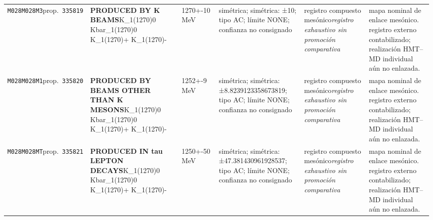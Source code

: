 \begin{landscape}
\begin{longtable}{L{1.85cm}L{4.45cm}L{2.35cm}L{4.05cm}L{3.35cm}L{7.15cm}}
\texttt{M028}\newline \texttt{M028M3}\newline prop.\ \texttt{335819} & \textbf{PRODUCED BY K BEAMS}\newline K\_\allowbreak{}1(1270)0 \textbar{}\allowbreak{} Kbar\_\allowbreak{}1(1270)0 \textbar{}\allowbreak{} K\_\allowbreak{}1(1270)+ \textbar{}\allowbreak{} K\_\allowbreak{}1(1270)- & 1270+-10\,MeV & simétrica; simétrica: ±10; tipo AC; límite NONE; confianza no consignado & registro compuesto mesónico\newline \emph{registro exhaustivo sin promoción comparativa} & mapa nominal de enlace mesónico. registro externo contabilizado; realización HMT--MD individual aún no enlazada. \\
\texttt{M028}\newline \texttt{M028M1}\newline prop.\ \texttt{335820} & \textbf{PRODUCED BY BEAMS OTHER THAN K MESONS}\newline K\_\allowbreak{}1(1270)0 \textbar{}\allowbreak{} Kbar\_\allowbreak{}1(1270)0 \textbar{}\allowbreak{} K\_\allowbreak{}1(1270)+ \textbar{}\allowbreak{} K\_\allowbreak{}1(1270)- & 1252+-9\,MeV & simétrica; simétrica: ±8.8239123358673819; tipo AC; límite NONE; confianza no consignado & registro compuesto mesónico\newline \emph{registro exhaustivo sin promoción comparativa} & mapa nominal de enlace mesónico. registro externo contabilizado; realización HMT--MD individual aún no enlazada. \\
\texttt{M028}\newline \texttt{M028MT}\newline prop.\ \texttt{335821} & \textbf{PRODUCED IN tau LEPTON DECAYS}\newline K\_\allowbreak{}1(1270)0 \textbar{}\allowbreak{} Kbar\_\allowbreak{}1(1270)0 \textbar{}\allowbreak{} K\_\allowbreak{}1(1270)+ \textbar{}\allowbreak{} K\_\allowbreak{}1(1270)- & 1250+-50\,MeV & simétrica; simétrica: ±47.381430961928537; tipo AC; límite NONE; confianza no consignado & registro compuesto mesónico\newline \emph{registro exhaustivo sin promoción comparativa} & mapa nominal de enlace mesónico. registro externo contabilizado; realización HMT--MD individual aún no enlazada. \\

\end{longtable}
\end{landscape}
